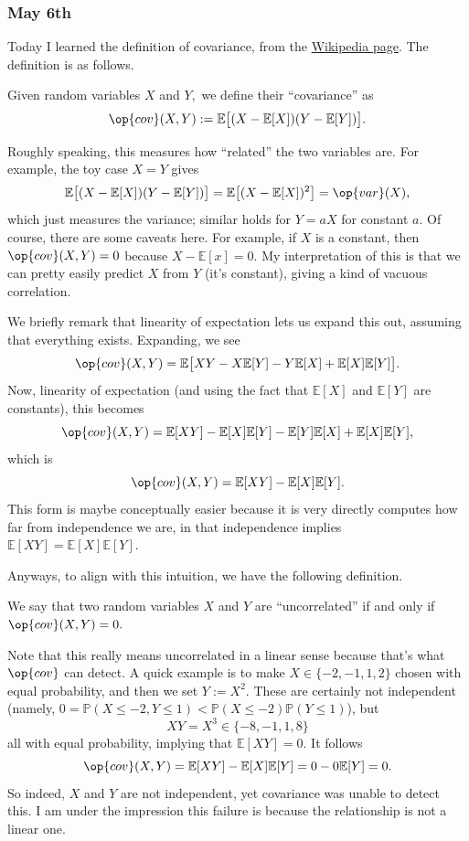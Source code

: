 \subsubsection{May 6th}
Today I learned the definition of covariance, from the \href{https://web.archive.org/web/20210427201700/https://en.wikipedia.org/wiki/Covariance}{Wikipedia page}. The definition is as follows.
\begin{definition}
    Given random variables $X$ and $Y,$ we define their ``covariance'' as
    \[\op{cov}(X,Y):=\mathbb E\big[(X-\mathbb E[X])(Y-\mathbb E[Y])\big].\]
\end{definition}
Roughly speaking, this measures how ``related'' the two variables are. For example, the toy case $X=Y$ gives
\[\mathbb E\big[(X-\mathbb E[X])(Y-\mathbb E[Y])\big]=\mathbb E\big[(X-\mathbb E[X])^2\big]=\op{var}(X),\]
which just measures the variance; similar holds for $Y=aX$ for constant $a.$ Of course, there are some caveats here. For example, if $X$ is a constant, then $\op{cov}(X,Y)=0$ because $X-\mathbb E[x]=0.$ My interpretation of this is that we can pretty easily predict $X$ from $Y$ (it's constant), giving a kind of vacuous correlation.

We briefly remark that linearity of expectation lets us expand this out, assuming that everything exists. Expanding, we see
\[\op{cov}(X,Y)=\mathbb E\big[XY-X\mathbb E[Y]-Y\mathbb E[X]+\mathbb E[X]\mathbb E[Y]\big].\]
Now, linearity of expectation (and using the fact that $\mathbb E[X]$ and $\mathbb E[Y]$ are constants), this becomes
\[\op{cov}(X,Y)=\mathbb E[XY]-\mathbb E[X]\mathbb E[Y]-\mathbb E[Y]\mathbb E[X]+\mathbb E[X]\mathbb E[Y],\]
which is
\[\op{cov}(X,Y)=\mathbb E[XY]-\mathbb E[X]\mathbb E[Y].\]
This form is maybe conceptually easier because it is very directly computes how far from independence we are, in that independence implies $\mathbb E[XY]=\mathbb E[X]\mathbb E[Y].$

Anyways, to align with this intuition, we have the following definition.
\begin{definition}
    We say that two random variables $X$ and $Y$ are ``uncorrelated'' if and only if $\op{cov}(X,Y)=0.$
\end{definition}
Note that this really means uncorrelated in a linear sense because that's what $\op{cov}$ can detect. A quick example is to make $X\in\{-2,-1,1,2\}$ chosen with equal probability, and then we set $Y:=X^2.$ These are certainly not independent (namely, $0=\mathbb P(X\le-2,Y\le1)<\mathbb P(X\le-2)\mathbb P(Y\le1)$), but
\[XY=X^3\in\{-8,-1,1,8\}\]
all with equal probability, implying that $\mathbb E[XY]=0.$ It follows
\[\op{cov}(X,Y)=\mathbb E[XY]-\mathbb E[X]\mathbb E[Y]=0-0\mathbb E[Y]=0.\]
So indeed, $X$ and $Y$ are not independent, yet covariance was unable to detect this. I am under the impression this failure is because the relationship is not a linear one.


